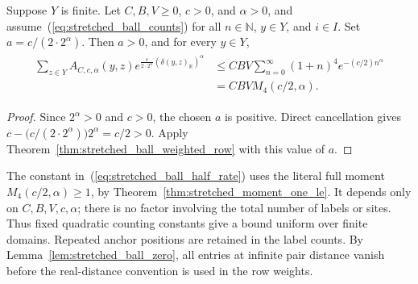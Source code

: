 \begin{theorem}
    \label{thm:stretched_ball_half_rate}
    \leanok
    Suppose $Y$ is finite.  Let $C,B,V\geq0$, $c>0$, and
    $\alpha>0$, and assume~(\ref{eq:stretched_ball_counts}) for all
    $n\in\mathbb N$, $y\in Y$, and $i\in I$.
    Set $a=c/(2\cdot2^\alpha)$.  Then $a>0$, and for every $y\in Y$,
    \begin{align}
        \begin{aligned}
            \sum_{z\in Y}A_{C,c,\alpha}(y,z)
            e^{\frac{c}{2\cdot2^\alpha}(\delta(y,z)_{\mathbb R})^\alpha}
             & \leq CBV\sum_{n=0}^{\infty}(1+n)^4e^{-(c/2)n^\alpha} \\
             & =CBV M_4(c/2,\alpha).
        \end{aligned}
        \label{eq:stretched_ball_half_rate}
    \end{align}
\end{theorem}
\begin{proof}
    \leanok
    Since $2^\alpha>0$ and $c>0$, the chosen $a$ is positive.
    Direct cancellation gives
    $c-\bigl(c/(2\cdot2^\alpha)\bigr)2^\alpha=c/2>0$.
    Apply Theorem~\ref{thm:stretched_ball_weighted_row} with this
    value of $a$.
\end{proof}

The constant in~(\ref{eq:stretched_ball_half_rate}) uses the literal
full moment $M_4(c/2,\alpha)\geq1$, by
Theorem~\ref{thm:stretched_moment_one_le}.  It depends only on
$C,B,V,c,\alpha$; there is no factor involving the total number of
labels or sites.  Thus fixed quadratic counting constants give
a bound uniform over finite domains.  Repeated anchor positions
are retained in the label counts.  By
Lemma~\ref{lem:stretched_ball_zero}, all entries at infinite pair
distance vanish before the real-distance convention is used in
the row weights.
